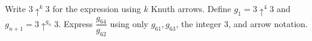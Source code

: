 Write $3\uparrow^{k}3$ for the expression using $k$ Knuth arrows. Define $g_1=3\uparrow^4 3$ and $g_{n+1}=3\uparrow^{g_n}3$. Express $\dfrac{g_{64}}{g_{62}}$ using only $g_{61},g_{63}$, the integer $3$, and arrow notation.

